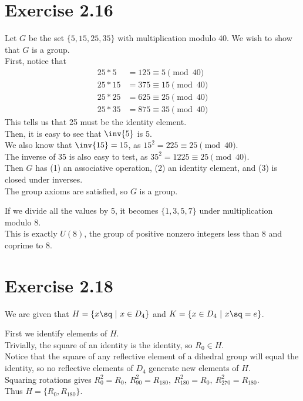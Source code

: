 \documentclass{article}
\begin{document}
\section*{Exercise 2.16}
Let \(G\) be the set \(\{5, 15, 25, 35\}\) with multiplication modulo 40. We wish to show that \(G\) is a group. \\
First, notice that \begin{align}
    25 * 5 &= 125 \equiv 5 \pmod{40} \\
    25 * 15 &= 375 \equiv 15 \pmod{40} \\
    25 * 25 &= 625 \equiv 25 \pmod{40} \\
    25 * 35 &= 875 \equiv 35 \pmod{40}
\end{align}
This tells us that 25 must be the identity element. \\
Then, it is easy to see that \(\inv{5}\) is 5. \\
We also know that \(\inv{15}=15\), as \(15^2=225\equiv 25\pmod{40}\). \\
The inverse of 35 is also easy to test, as \(35^2=1225\equiv 25\pmod{40}\). \\
Then \(G\) has (1) an associative operation, (2) an identity element, and (3) is closed under inverses. \\
The group axioms are satisfied, so \(G\) is a group.

If we divide all the values by 5, it becomes \(\{1, 3, 5, 7\}\) under multiplication modulo 8. \\
This is exactly \(U(8)\), the group of positive nonzero integers less than 8 and coprime to 8.

\section*{Exercise 2.18}
We are given that \(H=\left\{x\sq\ \vert\ x\in D_4\right\}\) and \(K=\left\{ x\in D_4\ \vert\ x\sq=e\right\}\).

First we identify elements of \(H\). \\
Trivially, the square of an identity is the identity, so \(R_0\in H\). \\
Notice that the square of any reflective element of a dihedral group will equal the identity, so no reflective elements of \(D_4\) generate new elements of \(H\). \\
Squaring rotations gives \(R_0^2=R_0,\ R_{90}^2=R_{180},\ R_{180}^2=R_0,\ R_{270}^2=R_{180}\). \\
Thus \(H=\{R_0, R_{180}\}\).
\end{document}
